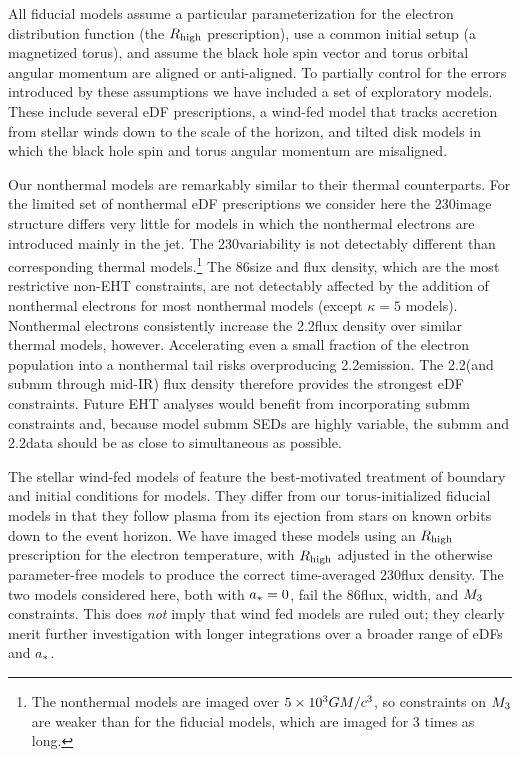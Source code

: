 All fiducial models assume a particular parameterization for the electron distribution function (the $R_\mathrm{high}$ prescription), use a common initial setup (a magnetized torus), and assume the black hole spin vector and torus orbital angular momentum are aligned or anti-aligned.
To partially control for the errors introduced by these assumptions we have included a set of exploratory models.  These include several eDF prescriptions, a wind-fed model that tracks accretion from stellar winds down to the scale of the horizon, and tilted disk models in which the black hole spin and torus angular momentum are misaligned.

Our nonthermal models are remarkably similar to their thermal counterparts.
For the limited set of nonthermal eDF prescriptions we consider here the 230\GHz image structure differs very little for models in which the nonthermal electrons are introduced mainly in the jet.  The 230\GHz variability is not detectably different than corresponding thermal models.\footnote{The nonthermal models are imaged over $5\times 10^3GM/c^3$, so constraints on $M_{3}$ are weaker than for the fiducial models, which are imaged for 3 times as long.}
The 86\GHz size and flux density, which are the most restrictive non-EHT constraints, are not detectably affected by the addition of nonthermal electrons for most nonthermal models (except $\kappa = 5$ models).
Nonthermal electrons consistently increase the 2.2\um flux density over similar thermal models, however.
Accelerating even a small fraction of the electron population into a nonthermal tail risks overproducing 2.2\um emission.
The 2.2\um (and submm through mid-IR) flux density therefore provides the strongest eDF constraints.
Future EHT analyses would benefit from incorporating submm constraints \citep[e.g.,][]{2019ApJ...881L...2B} and, because model submm SEDs are highly variable, the submm and 2.2\um data should be as close to simultaneous as possible.

The stellar wind-fed models of \citet{2020ApJ...896L...6R} feature the best-motivated treatment of boundary and initial conditions for \sgra models.
They differ from our torus-initialized fiducial models in that they follow plasma from its ejection from stars on known orbits down to the event horizon.
We have imaged these models using an $R_\mathrm{high}$ prescription for the electron temperature, with $R_\mathrm{high}$ adjusted in the otherwise parameter-free models to produce the correct time-averaged 230\GHz flux density.
The two models considered here, both with $a_* = 0$, fail the 86\GHz flux, \mring width, and $M_{3}$ constraints.
This does {\em not} imply that wind fed models are ruled out; they clearly merit further investigation with longer integrations over a broader range of eDFs and $a_*$.

